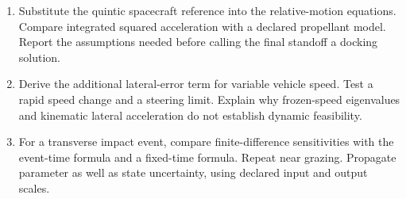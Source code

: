 \begin{enumerate}
\item Substitute the quintic spacecraft reference into the relative-motion equations. Compare integrated squared acceleration with a declared propellant model. Report the assumptions needed before calling the final standoff a docking solution.
\item Derive the additional lateral-error term for variable vehicle speed. Test a rapid speed change and a steering limit. Explain why frozen-speed eigenvalues and kinematic lateral acceleration do not establish dynamic feasibility.
\item For a transverse impact event, compare finite-difference sensitivities with the event-time formula and a fixed-time formula. Repeat near grazing. Propagate parameter as well as state uncertainty, using declared input and output scales.
\end{enumerate}
